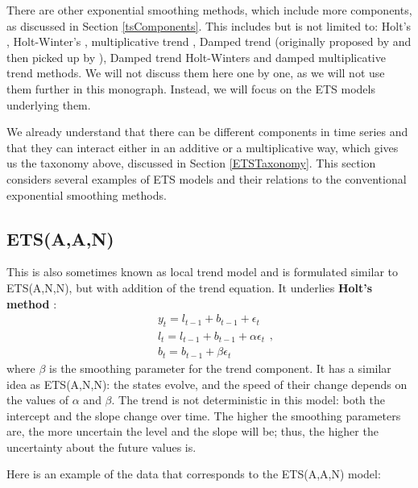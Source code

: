 \documentclass[
]{book}
\theoremstyle{definition}
\theoremstyle{definition}
\theoremstyle{definition}
\theoremstyle{definition}
\theoremstyle{remark}
\begin{document}
There are other exponential smoothing methods, which include more components, as discussed in Section \ref{tsComponents}. This includes but is not limited to: Holt's \citep[originally proposed in 1957]{Holt2004b}, Holt-Winter's \citep{Winters1960}, multiplicative trend \citep{Pegels1969}, Damped trend (originally proposed by \citet{Roberts1982} and then picked up by \citet{Gardner1985a}), Damped trend Holt-Winters \citep{Gardner1989} and damped multiplicative trend \citep{Taylor2003} methods. We will not discuss them here one by one, as we will not use them further in this monograph. Instead, we will focus on the ETS models underlying them.

We already understand that there can be different components in time series and that they can interact either in an additive or a multiplicative way, which gives us the taxonomy above, discussed in Section \ref{ETSTaxonomy}. This section considers several examples of ETS models and their relations to the conventional exponential smoothing methods.

\hypertarget{ETSAAN}{%
\subsection{ETS(A,A,N)}\label{ETSAAN}}

This is also sometimes known as local trend model and is formulated similar to ETS(A,N,N), but with addition of the trend equation. It underlies \textbf{Holt's method} \citep{Ord1997}:
\begin{equation}
  \begin{aligned}
    & y_{t} = l_{t-1} + b_{t-1} + \epsilon_t \\
    & l_t = l_{t-1} + b_{t-1} + \alpha \epsilon_t \\
    & b_t = b_{t-1} + \beta \epsilon_t
  \end{aligned} ,
  \label{eq:ETSAAN}
\end{equation}
where \(\beta\) is the smoothing parameter for the trend component. It has a similar idea as ETS(A,N,N): the states evolve, and the speed of their change depends on the values of \(\alpha\) and \(\beta\). The trend is not deterministic in this model: both the intercept and the slope change over time. The higher the smoothing parameters are, the more uncertain the level and the slope will be; thus, the higher the uncertainty about the future values is.

Here is an example of the data that corresponds to the ETS(A,A,N) model:
\end{document}
